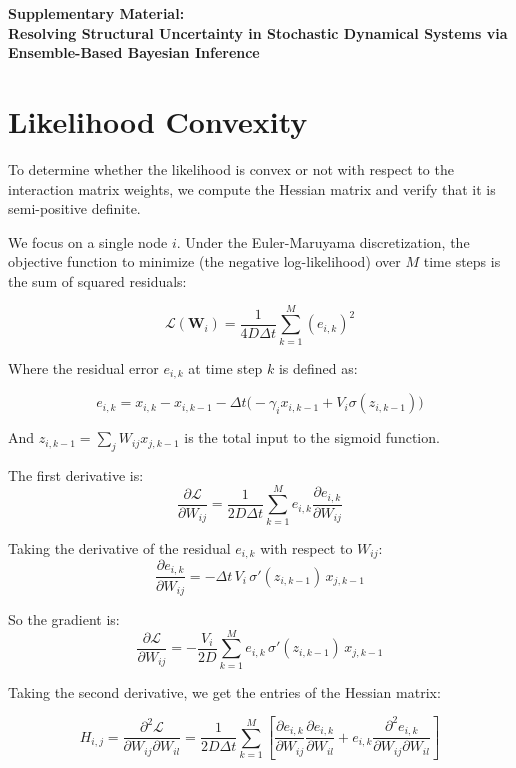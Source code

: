 \documentclass[10pt, aps, rmp,  twocolumn, superscriptaddress, floatfix, showkeys]{revtex4-2}
\begin{document}
\begin{center}
\textbf{\large Supplementary Material: \\ Resolving Structural Uncertainty in Stochastic Dynamical Systems via Ensemble-Based Bayesian Inference}
\end{center}
\vspace{0.5cm}

\section{Likelihood Convexity}

To determine whether the likelihood is convex or not with respect to the interaction matrix weights, we compute the Hessian matrix and verify that it is semi-positive definite.

We focus on a single node $i$. Under the Euler-Maruyama discretization, the objective function to minimize (the negative log-likelihood) over $M$ time steps is the sum of squared residuals:

$$ \mathcal{L}(\mathbf{W}_i) = \frac{1}{4D \Delta t} \sum_{k=1}^M (e_{i,k})^2 $$

Where the residual error $e_{i,k}$ at time step $k$ is defined as:

$$ e_{i,k} = x_{i, k} - x_{i, k-1} - \Delta t \Big( -\gamma_i x_{i, k-1} + V_i \sigma(z_{i,k-1}) \Big) $$

And $z_{i,k-1} = \sum_{j} W_{ij} x_{j,k-1}$ is the total input to the sigmoid function.

The first derivative is:
$$ \frac{\partial \mathcal{L}}{\partial W_{ij}} = \frac{1}{2D \Delta t} \sum_{k=1}^M e_{i,k} \frac{\partial e_{i,k}}{\partial W_{ij}} $$

Taking the derivative of the residual $e_{i,k}$ with respect to $W_{ij}$:
$$ \frac{\partial e_{i,k}}{\partial W_{ij}} = - \Delta t \, V_i \, \sigma'(z_{i,k-1}) \, x_{j, k-1} $$

So the gradient is:
$$ \frac{\partial \mathcal{L}}{\partial W_{ij}} = - \frac{V_i}{2D} \sum_{k=1}^M e_{i,k} \, \sigma'(z_{i,k-1}) \, x_{j, k-1} $$

Taking the second derivative, we get the entries of the Hessian matrix:

$$ H_{i,j} = \frac{\partial^2 \mathcal{L}}{\partial W_{ij} \partial W_{il}} = \frac{1}{2D \Delta t} \sum_{k=1}^M \left[ \frac{\partial e_{i,k}}{\partial W_{ij}} \frac{\partial e_{i,k}}{\partial W_{il}} + e_{i,k} \frac{\partial^2 e_{i,k}}{\partial W_{ij} \partial W_{il}} \right] $$
\end{document}
